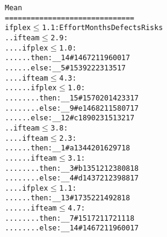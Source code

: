 {\scriptsize
\begin{alltt}
                                                 Mean
                                         ==============================
 if plex \(\le\) 1.1:                    Effort  Months  Defects  Risks
 .. if team \(\le\) 2.9:
 .. .. if plex \(\le\) 1.0:
 .. .. .. then: __14  #                  1467    21      19600    17
 .. .. .. else: __5  #                   1539    22      23135    17
 .. .. if team \(\le\) 4.3:
 .. .. .. if plex \(\le\) 1.0:
 .. .. .. .. then: __15  #               1570    20      14233    17
 .. .. .. .. else: __9  #          e     1468    21      15807    17
 .. .. .. else: __12  #            c     1890    23      15132    17
 .. if team \(\le\) 3.8:
 .. .. if team \(\le\) 2.3:
 .. .. .. then: __1  #             a     1344    20      16297    18
 .. .. .. if team \(\le\) 3.1:
 .. .. .. .. then: __3  #          b     1351    21      23808    18
 .. .. .. .. else: __4  #          d     1437    21      23988    17
 .. .. if plex \(\le\) 1.1:
 .. .. .. then: __13  #                  1735    22      14928    18
 .. .. .. if team \(\le\) 4.7:
 .. .. .. .. then: __7  #                1517    21      17211    18
 .. .. .. .. else: __14  #               1467    21      19600    17

\end{alltt}}
